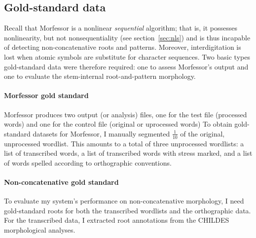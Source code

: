 {{\subsection{Gold-standard data}
Recall that Morfessor is a nonlinear \emph{sequential} algorithm; that is, it possesses nonlinearity, but not nonsequentiality (see section~\ref{sec:nls})
and is thus incapable of detecting non-concatenative roots and patterns. 
Moreover, interdigitation is lost when atomic symbols are substitute for character sequences. 
Two basic types gold-standard data were therefore required: one to assess Morfessor's output and one to evaluate the 
stem-internal root-and-pattern morphology.
 
\paragraph{Morfessor gold standard}
Morfessor produces two output (or analysis) files, one for the test file (processed words) and one for the control file (original or uprocessed words)
To obtain gold-standard datasets for Morfessor, I manually segmented $\frac{1}{10}$ of the original, unprocessed wordlist.
This amounts to a total of three unprocessed wordlists: a list of transcribed words, a list of transcribed words with stress marked, and a list of words spelled according to orthographic conventions. 

\paragraph{Non-concatenative gold standard}
To evaluate my system's performance on non-concatenative morphology, I need gold-standard roots for both the transcribed wordlists and the orthographic data. For the transcribed data, I extracted root annotations from the CHILDES morphological analyses. 

% 

}}
